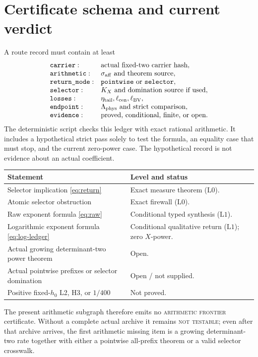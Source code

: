 \documentclass[11pt]{article}
\theoremstyle{definition}
\theoremstyle{remark}
\newcommand{\Lzero}{\mathrm{L0}}
\newcommand{\Lone}{\mathrm{L1}}
\begin{document}
\section{Certificate schema and current verdict}

A route record must contain at least
\[
\begin{array}{ll}
\texttt{carrier}:&\text{actual fixed-two carrier hash},\\
\texttt{arithmetic}:&\sigma_{\rm aff}\text{ and theorem source},\\
\texttt{return\_mode}:&\texttt{pointwise}\text{ or }\texttt{selector},\\
\texttt{selector}:&K_X\text{ and domination source if used},\\
\texttt{losses}:&\eta_{\rm tail},\ell_{\rm cen},\ell_{\rm BV},\\
\texttt{endpoint}:&\Lambda_{\rm phys}\text{ and strict comparison},\\
\texttt{evidence}:&\text{proved, conditional, finite, or open}.
\end{array}
\]
The deterministic script checks this ledger with exact rational
arithmetic.  It includes a hypothetical strict pass solely to test
the formula, an equality case that must stop, and the current
zero-power case.  The hypothetical record is not evidence about an
actual coefficient.

\begin{center}
\small
\begin{tabularx}{\textwidth}{@{}p{}X@{}}
\toprule
Statement & Level and status\\
\midrule
Selector implication \eqref{eq:return}
& Exact measure theorem (\(\Lzero\)).\\
Atomic selector obstruction
& Exact firewall (\(\Lzero\)).\\
Raw exponent formula \eqref{eq:raw}
& Conditional typed synthesis (\(\Lone\)).\\
Logarithmic exponent formula \eqref{eq:log-ledger}
& Conditional qualitative return (\(\Lone\)); zero \(X\)-power.\\
Actual growing determinant-two power theorem
& Open.\\
Actual pointwise prefixes or selector domination
& Open / not supplied.\\
Positive fixed-\(h_0\) L2, H3, or \(1/400\)
& Not proved.\\
\bottomrule
\end{tabularx}
\end{center}

The present arithmetic subgraph therefore emits no
\textsc{arithmetic frontier} certificate.  Without a complete
actual archive it remains \textsc{not testable}; even after that
archive arrives, the first arithmetic missing item is a growing
determinant-two rate together with either a pointwise all-prefix
theorem or a valid selector crosswalk.

\begingroup
\footnotesize
\raggedright


\endgroup
\end{document}
